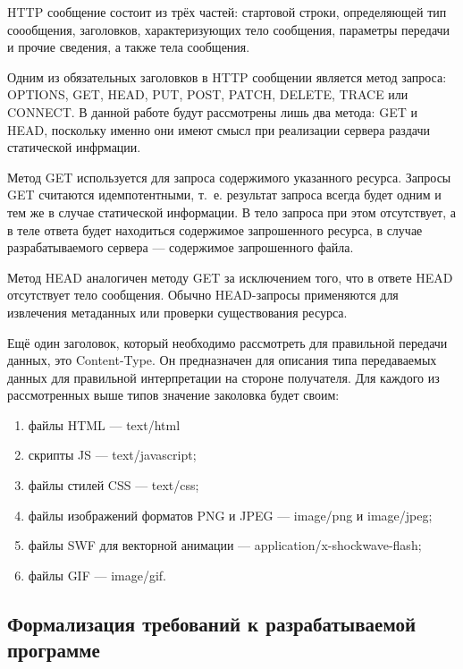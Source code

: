 HTTP сообщение состоит из трёх частей: стартовой строки, определяющей тип соообщения, заголовков, характеризующих тело сообщения, параметры передачи и прочие сведения,  а также тела сообщения.

Одним из обязательных заголовков в HTTP сообщении является метод запроса: OPTIONS, GET, HEAD, PUT, POST, PATCH, DELETE, TRACE или CONNECT. В данной работе будут рассмотрены лишь два метода: GET и HEAD, поскольку именно они имеют смысл при реализации сервера раздачи статической инфрмации. 

Метод GET используется для запроса содержимого указанного ресурса. Запросы GET считаются идемпотентными, т.~е. результат запроса всегда будет одним и тем же в случае статической информации. В тело запроса при этом отсутствует, а в теле ответа будет находиться содержимое запрошенного ресурса, в случае разрабатываемого сервера --- содержимое запрошенного файла.

Метод HEAD аналогичен методу GET за исключением того, что в ответе HEAD отсутствует тело сообщения. Обычно HEAD-запросы применяются для извлечения метаданных или проверки существования ресурса.

Ещё один заголовок, который необходимо рассмотреть для правильной передачи данных, это Content-Type. Он предназначен для описания типа передаваемых данных для правильной интерпретации на стороне получателя. Для каждого из рассмотренных выше типов значение заколовка будет своим:

\begin{enumerate}[label=\arabic*)]
	\item файлы HTML --- text/html
	\item скрипты JS --- text/javascript;
	\item файлы стилей CSS --- text/css;
	\item файлы изображений форматов PNG и JPEG --- image/png и image/jpeg;
	\item файлы SWF для векторной анимации --- application/x-shockwave-flash;
	\item файлы GIF --- image/gif.
\end{enumerate}

\subsection{Формализация требований к разрабатываемой программе}

